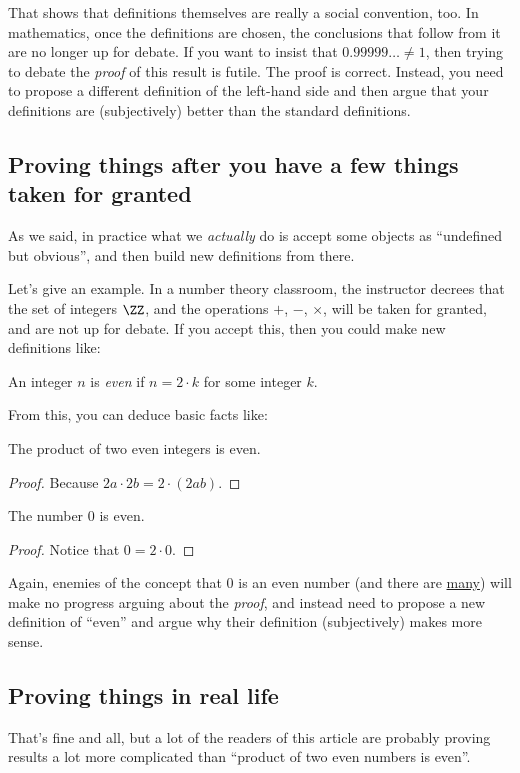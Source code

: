 \documentclass[11pt]{scrartcl}
\begin{document}
That shows that definitions themselves are really a social convention, too.
In mathematics, once the definitions are chosen,
the conclusions that follow from it are no longer up for debate.
If you want to insist that $0.99999\dots \neq 1$,
then trying to debate the \emph{proof} of this result is futile.
The proof is correct.
Instead, you need to propose a different definition of the left-hand side
and then argue that your definitions are (subjectively)
better than the standard definitions.

\subsection{Proving things after you have a few things taken for granted}
As we said, in practice what we \emph{actually} do is
accept some objects as ``undefined but obvious'',
and then build new definitions from there.

Let's give an example.
In a number theory classroom, the instructor decrees that the
set of integers $\ZZ$, and the operations $+$, $-$, $\times$,
will be taken for granted, and are not up for debate.
If you accept this, then you could make new definitions like:
\begin{definition}
  An integer $n$ is \emph{even} if $n = 2 \cdot k$ for some integer $k$.
\end{definition}
From this, you can deduce basic facts like:
\begin{fact}
The product of two even integers is even.
\end{fact}
\begin{proof}
Because $2a \cdot 2b = 2 \cdot (2ab)$.
\end{proof}
\begin{fact}
  The number $0$ is even.
\end{fact}
\begin{proof}
  Notice that $0 = 2 \cdot 0$.
\end{proof}
Again, enemies of the concept that $0$ is an even number
(and there are \href{https://en.wikipedia.org/wiki/Parity_of_zero}{many})
will make no progress arguing about the \emph{proof},
and instead need to propose a new definition of ``even''
and argue why their definition (subjectively) makes more sense.

\subsection{Proving things in real life}
That's fine and all, but a lot of the readers of this article
are probably proving results a lot more complicated than
``product of two even numbers is even''.
\end{document}

